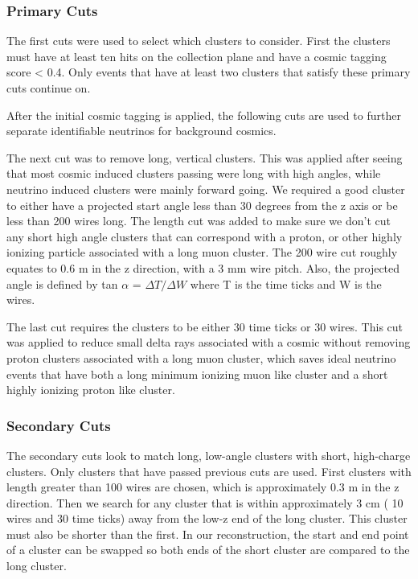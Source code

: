 \subsubsection{Primary Cuts}
The first cuts were used to select which clusters to consider. First the clusters must have at least ten hits on the collection plane and have a cosmic tagging score < 0.4. Only events that have at least two clusters that satisfy these primary cuts continue on.

After the initial cosmic tagging is applied, the following cuts are used to further separate identifiable neutrinos for background cosmics. 

The next cut was to remove long, vertical clusters. This was applied after seeing that most cosmic induced clusters passing were long with high angles, while neutrino induced clusters were mainly forward going. We required a good cluster to either have a projected start angle less than 30 degrees from the z axis or be less than 200 wires long. The length cut was added to make sure we don't cut any short high angle clusters that can correspond with a proton, or other highly ionizing particle associated with a long muon cluster. The 200 wire cut roughly equates to 0.6 m in the z direction, with a 3 mm wire pitch. Also, the projected angle is defined by tan $\alpha$ = $\Delta T / \Delta W$ where T is the time ticks and W is the wires. 

The last cut requires the clusters to be either 30 time ticks or 30 wires. This cut was applied to reduce small delta rays associated with a cosmic without removing proton clusters associated with a long muon cluster, which saves ideal neutrino events that have both a long minimum ionizing muon like cluster and a short highly ionizing proton like cluster.

\subsubsection{Secondary Cuts}
The secondary cuts look to match long, low-angle clusters with short, high-charge clusters. Only clusters that have passed previous cuts are used. First clusters with length greater than 100 wires are chosen, which is approximately 0.3 m in the z direction. Then we search for any cluster that is within approximately 3 cm ( 10 wires and 30 time ticks) away from the low-z end of the long cluster. This cluster must also be shorter than the first. In our reconstruction, the start and end point of a cluster can be swapped so both ends of the short cluster are compared to the long cluster. 

